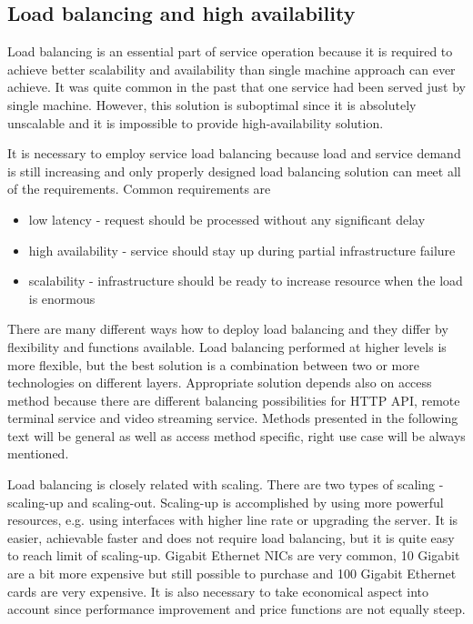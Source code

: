 \subsection{Load balancing and high availability}

Load balancing is an essential part of service operation because it is required to achieve better scalability and availability than single machine approach can ever achieve. It was quite common in the past that one service had been served just by single machine. However, this solution is suboptimal since it is absolutely unscalable and it is impossible to provide high-availability solution.

It is necessary to employ service load balancing because load and service demand is still increasing and only properly designed load balancing solution can meet all of the requirements. Common requirements are
	\begin{itemize}
		\item low latency - request should be processed without any significant delay
		\item high availability - service should stay up during partial infrastructure failure
		\item scalability - infrastructure should be ready to increase resource when the load is enormous
	\end{itemize}

There are many different ways how to deploy load balancing and they differ by flexibility and functions available. Load balancing performed at higher levels is more flexible, but the best solution is a combination between two or more technologies on different layers. Appropriate solution depends also on access method because there are different balancing possibilities for \Ac{HTTP} \Ac{API}, remote terminal service and video streaming service. Methods presented in the following text will be general as well as access method specific, right use case will be always mentioned.

Load balancing is closely related with scaling. There are two types of scaling - scaling-up and scaling-out. Scaling-up is accomplished by using more powerful resources, e.g. using interfaces with higher line rate or upgrading the server. It is easier, achievable faster and does not require load balancing, but it is quite easy to reach limit of scaling-up. Gigabit Ethernet \Ac{NIC}s are very common, 10 Gigabit are a bit more expensive but still possible to purchase and 100 Gigabit Ethernet cards are very expensive. It is also necessary to take economical aspect into account since performance improvement and price functions are not equally steep. 

